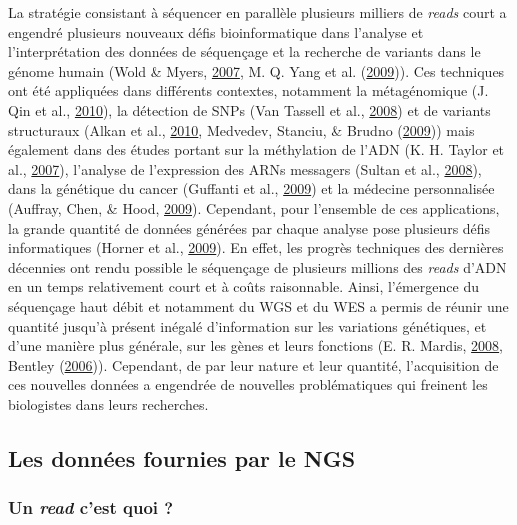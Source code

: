 \documentclass[12pt,twoside]{reedthesis}
\theoremstyle{definition}
\theoremstyle{definition}
\theoremstyle{remark}
\begin{document}
  La stratégie consistant à séquencer en parallèle plusieurs milliers de
  \emph{reads} court a engendré plusieurs nouveaux défis bioinformatique
  dans l'analyse et l'interprétation des données de séquençage et la
  recherche de variants dans le génome humain (Wold \& Myers,
  \protect\hyperlink{ref-Wold2007}{2007}, M. Q. Yang et al.
  (\protect\hyperlink{ref-Yang2009}{2009})). Ces techniques ont été
  appliquées dans différents contextes, notamment la métagénomique (J. Qin
  et al., \protect\hyperlink{ref-Qin2010}{2010}), la détection de SNPs
  (Van Tassell et al., \protect\hyperlink{ref-VanTassell2008}{2008}) et de
  variants structuraux (Alkan et al.,
  \protect\hyperlink{ref-Alkan2010}{2010}, Medvedev, Stanciu, \& Brudno
  (\protect\hyperlink{ref-Medvedev2009}{2009})) mais également dans des
  études portant sur la méthylation de l'ADN (K. H. Taylor et al.,
  \protect\hyperlink{ref-Taylor2007}{2007}), l'analyse de l'expression des
  ARNs messagers (Sultan et al.,
  \protect\hyperlink{ref-Sultan2008}{2008}), dans la génétique du cancer
  (Guffanti et al., \protect\hyperlink{ref-Guffanti2009}{2009}) et la
  médecine personnalisée (Auffray, Chen, \& Hood,
  \protect\hyperlink{ref-Auffray2009}{2009}). Cependant, pour l'ensemble
  de ces applications, la grande quantité de données générées par chaque
  analyse pose plusieurs défis informatiques (Horner et al.,
  \protect\hyperlink{ref-Horner2009}{2009}). En effet, les progrès
  techniques des dernières décennies ont rendu possible le séquençage de
  plusieurs millions des \emph{reads} d'ADN en un temps relativement court
  et à coûts raisonnable. Ainsi, l'émergence du séquençage haut débit et
  notamment du WGS et du WES a permis de réunir une quantité jusqu'à
  présent inégalé d'information sur les variations génétiques, et d'une
  manière plus générale, sur les gènes et leurs fonctions (E. R. Mardis,
  \protect\hyperlink{ref-Mardis2008}{2008}, Bentley
  (\protect\hyperlink{ref-Bentley2006}{2006})). Cependant, de par leur
  nature et leur quantité, l'acquisition de ces nouvelles données a
  engendrée de nouvelles problématiques qui freinent les biologistes dans
  leurs recherches.
  
  \subsection{Les données fournies par le
  NGS}\label{les-donnees-fournies-par-le-ngs}
  
  \subsubsection{\texorpdfstring{Un \emph{read} c'est quoi
  ?}{Un read c'est quoi ?}}\label{un-read-cest-quoi}
  
\end{document}

